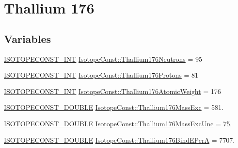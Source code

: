 \hypertarget{group___isotope_const-_thallium-_tl176}{}\section{Thallium 176}
\label{group___isotope_const-_thallium-_tl176}
\subsection*{Variables}
\begin{DoxyCompactItemize}
\item 
\mbox{\hyperlink{group___isotope_const-_macros_ga5f18360b3e99483a35c32d789e62621c}{I\+S\+O\+T\+O\+P\+E\+C\+O\+N\+S\+T\+\_\+\+I\+NT}} \mbox{\hyperlink{group___isotope_const-_thallium-_tl176_ga3b9e472bbb8b78522f62d1aafe2b5e07}{Isotope\+Const\+::\+Thallium176\+Neutrons}} = 95
\item 
\mbox{\hyperlink{group___isotope_const-_macros_ga5f18360b3e99483a35c32d789e62621c}{I\+S\+O\+T\+O\+P\+E\+C\+O\+N\+S\+T\+\_\+\+I\+NT}} \mbox{\hyperlink{group___isotope_const-_thallium-_tl176_ga951f92364e7268391d9914934d87651a}{Isotope\+Const\+::\+Thallium176\+Protons}} = 81
\item 
\mbox{\hyperlink{group___isotope_const-_macros_ga5f18360b3e99483a35c32d789e62621c}{I\+S\+O\+T\+O\+P\+E\+C\+O\+N\+S\+T\+\_\+\+I\+NT}} \mbox{\hyperlink{group___isotope_const-_thallium-_tl176_ga8b8d54051ea6eb82b65fb6e3bf3fdbb9}{Isotope\+Const\+::\+Thallium176\+Atomic\+Weight}} = 176
\item 
\mbox{\hyperlink{group___isotope_const-_macros_ga8f45a7272ce02c0b4c65c44636ed719a}{I\+S\+O\+T\+O\+P\+E\+C\+O\+N\+S\+T\+\_\+\+D\+O\+U\+B\+LE}} \mbox{\hyperlink{group___isotope_const-_thallium-_tl176_ga4804e641c7febd15b93614d60263d924}{Isotope\+Const\+::\+Thallium176\+Mass\+Exc}} = 581.
\item 
\mbox{\hyperlink{group___isotope_const-_macros_ga8f45a7272ce02c0b4c65c44636ed719a}{I\+S\+O\+T\+O\+P\+E\+C\+O\+N\+S\+T\+\_\+\+D\+O\+U\+B\+LE}} \mbox{\hyperlink{group___isotope_const-_thallium-_tl176_ga682dc896d7171f7962586d6b4935e98e}{Isotope\+Const\+::\+Thallium176\+Mass\+Exc\+Unc}} = 75.
\item 
\mbox{\hyperlink{group___isotope_const-_macros_ga8f45a7272ce02c0b4c65c44636ed719a}{I\+S\+O\+T\+O\+P\+E\+C\+O\+N\+S\+T\+\_\+\+D\+O\+U\+B\+LE}} \mbox{\hyperlink{group___isotope_const-_thallium-_tl176_ga4641c731f59172790514b113dc628b25}{Isotope\+Const\+::\+Thallium176\+Bind\+E\+PerA}} = 7707.
\item 

\end{DoxyCompactItemize}

